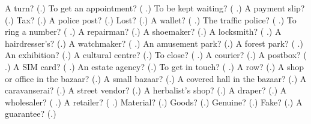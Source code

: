 \begin{tcolorbox}[breakable,colback=teal!4,colframe=teal!35!black,title={Before you move on}]
A turn? (\textbf{}.) To get an appointment? (\textbf{ }.) To be kept waiting? (\textbf{ }.) A payment slip? (\textbf{}.) Tax? (\textbf{}.) A police post? (\textbf{}.) Lost? (\textbf{}.) A wallet? (\textbf{ }.) The traffic police? (\textbf{ }.) To ring a number? (\textbf{ }.) A repairman? (\textbf{}.) A shoemaker? (\textbf{}.) A locksmith? (\textbf{ }.) A hairdresser's? (\textbf{}.) A watchmaker? (\textbf{ }.) An amusement park? (\textbf{}.) A forest park? (\textbf{ }.) An exhibition? (\textbf{}.) A cultural centre? (\textbf{}.) To close? (\textbf{ }.) A courier? (\textbf{}.) A postbox? (\textbf{ }.) A SIM card? (\textbf{ }.) An estate agency? (\textbf{}.) To get in touch? (\textbf{ }.) A row? (\textbf{}.) A shop or office in the bazaar? (\textbf{}.) A small bazaar? (\textbf{}.) A covered hall in the bazaar? (\textbf{}.) A caravanserai? (\textbf{}.) A street vendor? (\textbf{}.) A herbalist's shop? (\textbf{}.) A draper? (\textbf{}.) A wholesaler? (\textbf{ }.) A retailer? (\textbf{ }.) Material? (\textbf{}.) Goods? (\textbf{}.) Genuine? (\textbf{}.) Fake? (\textbf{}.) A guarantee? (\textbf{}.)
\end{tcolorbox}
